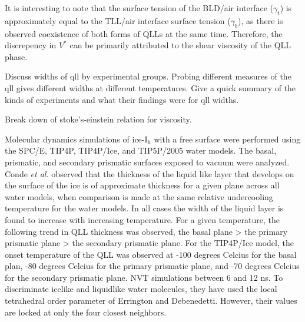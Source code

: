 It is interesting to note that the surface tension of the BLD/air
interface ($\gamma_t$) is approximately equal to the TLL/air interface
surface tension ($\gamma_b$), as there is observed coexistence of both
forms of QLLs at the same time. Therefore, the discrepency in $V^*$
can be primarily attributed to the shear viscosity of the QLL phase.
 


Discuss widths of qll by experimental groups. Probing different
measures of the qll gives different widths at different
temperatures. Give a quick summary of the kinds of experiments and
what their findings were for qll widths.




Break down of stoke's-einstein relation for viscosity. \cite{Chen2006,
  Tarjus1995,Bordat2003,Kumar2007}


Molecular dynamics simulations of ice-I$_\mathrm{h}$ with a free
surface were performed using the SPC/E, TIP4P, TIP4P/Ice, and
TIP5P/2005 water models. The basal, prismatic, and secondary prismatic
surfaces exposed to vacuum were analyzed. Conde \textit{et al.}
observed that the thickness of the liquid like layer that develops on
the surface of the ice is of approximate thickness for a given plane
across all water models, when comparison is made at the same relative
undercooling temperature for the water models.\cite{Conde2008} In all
cases the width of the liquid layer is found to increase with
increasing temperature. For a given temperature, the following trend
in QLL thickness was observed, the basal plane > the primary prismatic
plane > the secondary prismatic plane. For the TIP4P/Ice model, the
onset temperature of the QLL was observed at -100 degrees Celcius for
the basal plan, -80 degrees Celcius for the primary prismatic plane,
and -70 degrees Celcius for the secondary prismatic plane. NVT
simulations between 6 and 12 ns. To discriminate icelike and
liquidlike water molecules, they have used the local tetrahedral order
parameter of Errington and Debenedetti. However, their values are
locked at only the four closest neighbors.

